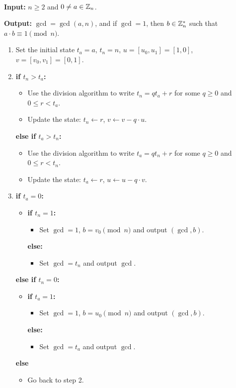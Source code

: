 \begin{algo}~

{\bf Input:} $n \geq 2$ and $0 \neq a \in \mathbb{Z}_n$.

{\bf Output:} $\gcd = \gcd(a, n)$, and if $\gcd = 1$, then $b \in \mathbb{Z}_n^*$ such that $a \cdot b \equiv 1 \pmod n$. 
\begin{enumerate}
    \item Set the initial state $t_a = a$, $t_n = n$, $u = [u_0, u_1] = [1, 0]$, $v = [v_0, v_1] = [0, 1]$. 
    \item {\bf if $t_n > t_a$:}
    \begin{itemize}
        \item Use the division algorithm to write $t_n = qt_a + r$ for some 
        $q \geq 0$ and $0 \leq r < t_a$.
        \item Update the state: $t_n \gets r$, $v \gets v - q \cdot u$.
    \end{itemize}
    {\bf else if $t_a > t_n$:}
    \begin{itemize}
        \item Use the division algorithm to write $t_a = qt_n + r$ for some 
        $q \geq 0$ and $0 \leq r < t_n$.
        \item Update the state: $t_a \gets r$, $u \gets u - q \cdot v$. 
    \end{itemize}
    \item {\bf if $t_a = 0$:}
    \begin{itemize}
        \item {\bf if $t_n = 1$:} 
        \begin{itemize}[$\circ$]
            \item Set $\gcd = 1$, $b = v_0 \pmod n$ and output $(\gcd, b)$.
        \end{itemize}
        {\bf else:} 
        \begin{itemize}[$\circ$]
            \item Set $\gcd = t_n$ and output $\gcd$. 
        \end{itemize}
    \end{itemize}
    {\bf else if $t_n = 0$:}
    \begin{itemize}
        \item {\bf if $t_a = 1$:} 
        \begin{itemize}[$\circ$]
            \item Set $\gcd = 1$, $b = u_0 \pmod n$ and output $(\gcd, b)$.
        \end{itemize}
        {\bf else:} 
        \begin{itemize}[$\circ$]
            \item Set $\gcd = t_a$ and output $\gcd$.  
        \end{itemize}
    \end{itemize}
    {\bf else}
    \begin{itemize}
        \item Go back to step 2. 
    \end{itemize}
\end{enumerate}
\end{algo}

